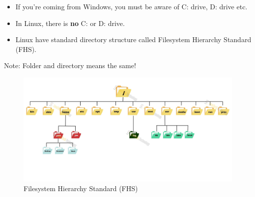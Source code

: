 
\begin{flushleft}
	\begin{itemize}
		\item If you’re coming from Windows, you must be aware of C: drive, D: drive etc.
		\item In Linux, there is \textbf{no} C: or D: drive. 
		\item Linux have standard directory structure called Filesystem Hierarchy Standard (FHS).
	\end{itemize}
	
	\begin{tcolorbox}[breakable,notitle,boxrule=-1pt,colback=yellow,colframe=yellow]
		\color{black}
		\bigskip
		Note: Folder and directory means the same!
		\bigskip
	\end{tcolorbox}
	
	\bigskip
	\begin{figure}[h!]
		\centering
		\includegraphics[scale=.24]{content/chapter2/images/fhs.jpg}
		\caption{Filesystem Hierarchy Standard (FHS)}
		\label{fig:fhs}
	\end{figure}
\end{flushleft}

\newpage

